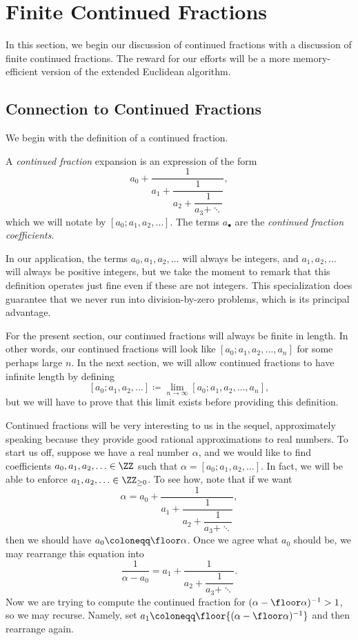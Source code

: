 \documentclass[../notes.tex]{subfiles}
\begin{document}
\section{Finite Continued Fractions}

In this section, we begin our discussion of continued fractions with a discussion of finite continued fractions. The reward for our efforts will be a more memory-efficient version of the extended Euclidean algorithm.

\subsection{Connection to Continued Fractions}
We begin with the definition of a continued fraction.
\begin{definition}
	A \textit{continued fraction} expansion is an expression of the form
	\[a_0+\dfrac1{a_1+\dfrac1{a_2+\dfrac1{a_3+\ddots}}},\]
	which we will notate by $[a_0;a_1,a_2,\ldots]$. The terms $a_\bullet$ are the \textit{continued fraction coefficients}.
\end{definition}
In our application, the terms $a_0,a_1,a_2,\ldots$ will always be integers, and $a_1,a_2,\ldots$ will always be positive integers, but we take the moment to remark that this definition operates just fine even if these are not integers. This specialization does guarantee that we never run into division-by-zero problems, which is its principal advantage.
\begin{remark} \label{rem:cf-limit}
	For the present section, our continued fractions will always be finite in length. In other words, our continued fractions will look like $[a_0;a_1,a_2,\ldots,a_n]$ for some perhaps large $n$. In the next section, we will allow continued fractions to have infinite length by defining
	\[[a_0;a_1,a_2,\ldots]\coloneqq\lim_{n\to\infty}[a_0;a_1,a_2,\ldots,a_n],\]
	but we will have to prove that this limit exists before providing this definition.
\end{remark}
Continued fractions will be very interesting to us in the sequel, approximately speaking because they provide good rational approximations to real numbers. To start us off, suppose we have a real number $\alpha$, and we would like to find coefficients $a_0,a_1,a_2,\ldots\in\ZZ$ such that $\alpha=[a_0;a_1,a_2,\ldots]$. In fact, we will be able to enforce $a_1,a_2,\ldots\in\ZZ_{\ge0}$. To see how, note that if we want
\[\alpha=a_0+\dfrac1{a_1+\dfrac1{a_2+\dfrac1{a_3+\ddots}}},\]
then we should have $a_0\coloneqq\floor\alpha$. Once we agree what $a_0$ should be, we may rearrange this equation into
\[\frac1{\alpha-a_0}=a_1+\dfrac1{a_2+\dfrac1{a_3+\ddots}}.\]
Now we are trying to compute the continued fraction for $(\alpha-\floor\alpha)^{-1}>1$, so we may recurse. Namely, set $a_1\coloneqq\floor{(\alpha-\floor\alpha)^{-1}}$ and then rearrange again.
\end{document}
